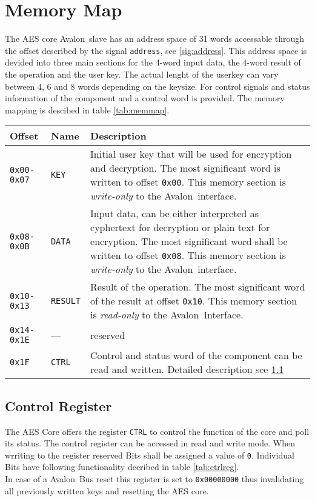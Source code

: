 \documentclass{ruschidoc}
\begin{document}
\section{Memory Map}
\label{sec:memmap}
The AES core Avalon\rtm\ slave has an address space of 31 words accessable through the
offset described by the signal \texttt{address}, see \ref{sig:address}. This address
space is devided into three main sections for the 4-word input data, the 4-word
result of the operation and the user key. The actual lenght of the userkey can vary
between 4, 6 and 8 words depending on the keysize. For control signals and status
information of the component and a control word is provided. The memory mapping is
descibed in table \ref{tab:memmap}.\\

\begin{tabularx}{\textwidth}{|p{18mm}|p{14mm} |X|}
  \hline
  \bf{Offset} 	  & \bf{Name} & \bf{Description}\\ \hline
  \texttt{0x00-0x07} & \texttt{KEY}  & Initial user key that will be used for encryption and decryption. 
	The most significant word is written to offset \texttt{0x00}. This memory section is \emph{write-only} to the Avalon\rtm\ interface.\\ 
\hline 	 
  \texttt{0x08-0x0B} & \texttt{DATA} & Input data, can be either interpreted as cyphertext for decryption or plain text for encryption. 
	The most significant word shall be written to offset \texttt{0x08}. This memory section is \emph{write-only} to the Avalon\rtm\ interface. \\ 
\hline
  \texttt{0x10-0x13} & \texttt{RESULT} & Result of the operation. The most significant word of the result at offset \texttt{0x10}.  
	This memory section is \emph{read-only} to the Avalon\rtm\ Interface.  \\ 
\hline	 
   \texttt{0x14-0x1E} & --- &  reserved  \\ \hline	 
 \texttt{0x1F} & \texttt{CTRL} & Control and status word of the component can be read and written. Detailed description see \ref{sec:ctrl}\\ 
\hline	
\end{tabularx}
\label{tab:memmap}

\subsection{Control Register}
\label{sec:ctrl}
The AES Core offers the register \texttt{CTRL} to control the function of the core
and poll its status. The control register can be accessed in read and write mode.
 When wrriting to the register reserved Bits shall be assigned a value of \texttt{0}.
 Individual Bits have following functionality decribed in table \ref{tab:ctrlreg}. \\
In case of a Avalon\rtm\ Bus reset this register is set to \texttt{0x00000000} thus
invalidating all previously written keys and resetting the AES core.
\end{document}
